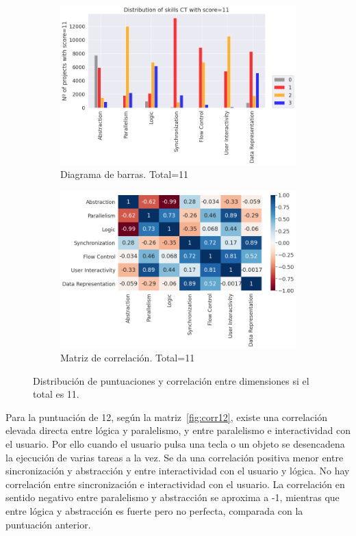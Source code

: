 \documentclass[a4paper, 12pt]{book}
\begin{document}
\begin{figure}[H]
    \centering
    \begin{subfigure}[h]{.49\textwidth} 
        \includegraphics[width=\textwidth]{img/distribucion_11_Scratch}
        \caption{Diagrama de barras. Total=11}
        \label{fig:total11}
    \end{subfigure}       
    \begin{subfigure}[h]{.49\textwidth} 
        \includegraphics[width=\textwidth]{img/corr_11_Scratch}
        \caption{Matriz de correlación. Total=11}
        \label{fig:corr11}
    \end{subfigure}
     \caption{Distribución de puntuaciones y correlación entre dimensiones si el total es 11.}
\end{figure}

Para la puntuación de 12, según la matriz~\ref{fig:corr12}, existe una correlación elevada directa entre lógica y paralelismo, y entre paralelismo e interactividad con el usuario. Por ello cuando el usuario pulsa una tecla o un objeto se desencadena la ejecución de varias tareas a la vez. Se da una correlación positiva menor entre sincronización y abstracción y entre interactividad con el usuario y lógica. No hay correlación entre sincronización e interactividad con el usuario. La correlación en sentido negativo entre paralelismo y abstracción se aproxima a -1, mientras que entre lógica y abstracción es fuerte pero no perfecta, comparada con la puntuación anterior. 
\end{document}
